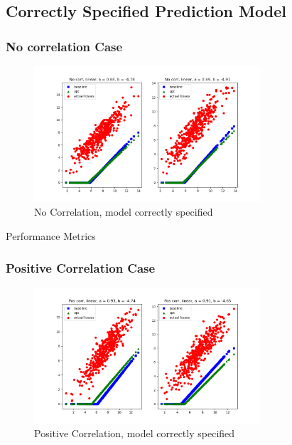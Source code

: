 \documentclass[11pt]{article}
\begin{document}
  \subsection{Correctly Specified Prediction Model}
    \subsubsection{No correlation Case}
    \begin{figure}[H]
        \centering
        \caption{No Correlation, model correctly specified}
        \includegraphics[width=0.75\textwidth]{../../output/figures/Exploration/no_correlation_linear.png}
    \end{figure}

    \begin{table}[H]
        \centering
        \small
        \caption{Performance Metrics}
        \resizebox*{\columnwidth}{!}{}
    \end{table}


    \subsubsection{Positive Correlation Case}
    \begin{figure}[H]
        \centering
        \caption{Positive Correlation, model correctly specified}
        \includegraphics[width=0.75\textwidth]{../../output/figures/Exploration/pos_correlation_linear.png}
    \end{figure}
\end{document}
